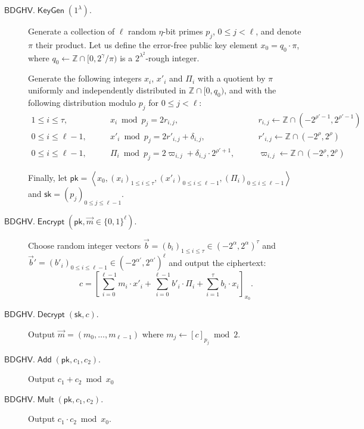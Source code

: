 \documentclass[11pt]{llncs}
\renewcommand\leq\leqslant
\newcommand{\Z}{{\mathbb Z}}
\DeclareMathOperator{\KeyGen}{\ensuremath{\mathsf{KeyGen}}}
\DeclareMathOperator{\Encrypt}{\ensuremath{\mathsf{Encrypt}}}
\DeclareMathOperator{\Decrypt}{\ensuremath{\mathsf{Decrypt}}}
\DeclareMathOperator{\Add}{\ensuremath{\mathsf{Add}}}
\DeclareMathOperator{\Mult}{\ensuremath{\mathsf{Mult}}}
\newcommand*{\pk}{\ensuremath{\mathsf{pk}}}
\newcommand*{\sk}{\ensuremath{\mathsf{sk}}}
\newcommand*{\BDGHV}{\ensuremath{\mathsf{BDGHV}}}
\begin{document}
\begin{description}
\item[$\BDGHV.\KeyGen(1^\lambda)$.] Generate a collection of $\ell$
random $\eta$-bit primes $p_j$, $0\leq j<\ell$, and denote $\pi$
their product. Let us define the error-free public key element
$x_0=q_0\cdot\pi$, where $q_0 \leftarrow \Z \cap [0,2^{\gamma}/\pi)$
  is a $2^{\lambda^2}$-rough integer.

  Generate the following integers $x_i$, $x'_i$ and $\varPi_i$ with a quotient by $\pi$ uniformly
  and independently distributed in $\Z\cap [0, q_0)$, and with the
    following distribution modulo $p_j$ for $0 \leq j < \ell$:
$$
\begin{array}{lll}
1 \leq i \leq \tau, & \qquad x_i\bmod p_j = 2r_{i,j},& \qquad r_{i,j}
\leftarrow\Z\cap(-2^{\rho'-1}, 2^{\rho'-1}) \\[.2cm]

0\leq i\leq \ell-1, & \qquad x'_i\bmod p_j = 2r'_{i,j}+\delta_{i,j}, &
\qquad r'_{i,j}\leftarrow\Z\cap(-2^{\rho}, 2^{\rho}) \\[.2cm]

0\leq i\leq \ell-1, & \qquad \varPi_i \bmod p_j = 2\varpi_{i,j} +
\delta_{i,j}\cdot 2^{\rho'+1}, &
\qquad \varpi_{i,j}\leftarrow\Z\cap(-2^{\rho}, 2^{\rho})
\end{array}
$$

Finally, let $\pk = \left\langle x_0, \left(x_i\right)_{1\leq i\leq \tau}, \left(x'_i\right)_{0\leq i\leq \ell-1}, \left(\varPi_i\right)_{0\leq i\leq {\ell-1}}\right\rangle$ and $\sk=(p_j)_{0\leq j\leq {\ell-1}}$.

\item[$\BDGHV.\Encrypt(\pk, \vec{m} \in \{0,1\}^\ell)$.] Choose 
  random integer vectors $\vec b=(b_i)_{1\leq i\leq \tau}
  \in(-2^\alpha,2^{\alpha})^\tau$ and $\vec b'=(b'_i)_{0\leq i\leq
      \ell-1} \in(-2^{\alpha'},2^{\alpha'})^{\ell}$ 
and output the ciphertext:
\begin{equation}
\label{eq:encbdghv}
c = \left[\sum\limits_{i=0}^{\ell-1} m_i \cdot x'_i + 
	\sum_{i=0}^{\ell-1} b'_i\cdot \varPi_i  + \sum_{i=1}^\tau 
b_i\cdot x_i\right]_{x_0}.
\end{equation}
\item[$\BDGHV.\Decrypt(\sk, c)$.] Output $\vec{m}=(m_0,\ldots,m_{\ell-1})$ where $m_j \leftarrow [c]_{p_j} \bmod 2$.
\\\vspace{-0.25cm}
\item[$\BDGHV.\Add(\pk, c_1, c_2)$.] Output $c_1+c_2 \bmod x_0$
\\\vspace{-0.25cm}
\item[$\BDGHV.\Mult(\pk, c_1, c_2)$.] Output $c_1 \cdot c_2 \bmod x_0$.
\end{description}
\end{document}
